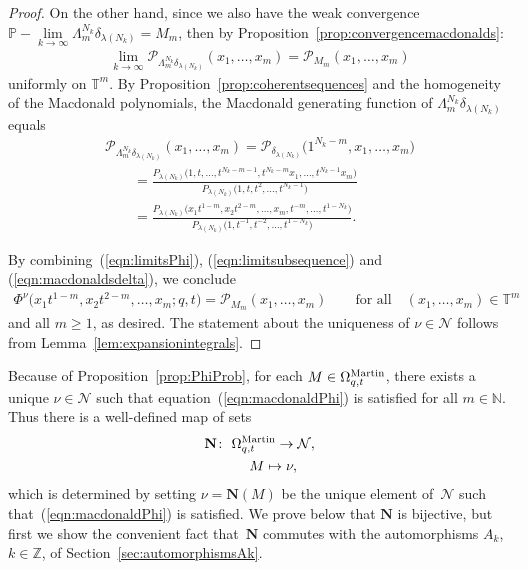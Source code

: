\documentclass[pdftex]{sigma}
\numberwithin{equation}{section}
\newcommand{\Z}{\mathbb{Z}}
\newcommand{\N}{\mathbb{N}}
\newcommand{\Nu}{\mathcal{N}}
\newcommand{\PPP}{\mathcal{P}}
\newcommand{\TT}{\mathbb{T}}
\newcommand{\Mart}{\Omega_{q, t}^{\rm Martin}}
\newcommand{\NN}{\mathbf{N}}
\begin{document}
\begin{proof}
On the other hand, since we also have the weak convergence $\mathbb{P}-\lim\limits_{k\rightarrow\infty}{\Lambda^{N_k}_m\delta_{\lambda(N_k)}} = M_m$, then by Proposition~\ref{prop:convergencemacdonalds}:
\begin{gather}\label{eqn:limitsubsequence}
\lim_{k \rightarrow \infty}{\PPP_{\Lambda^{N_k}_m\delta_{\lambda(N_k)}}(x_1, \dots, x_m)} = \PPP_{M_m}(x_1, \dots, x_m)
\end{gather}
uniformly on $\TT^m$. By Proposition~\ref{prop:coherentsequences} and the homogeneity of the Macdonald polynomials, the Macdonald generating function of $\Lambda^{N_k}_m\delta_{\lambda(N_k)}$ equals
\begin{gather}
\PPP_{\Lambda^{N_k}_m\delta_{\lambda(N_k)}}(x_1, \dots, x_m) = \PPP_{\delta_{\lambda(N_k)}}\big(1^{N_k - m}, x_1, \dots, x_m\big)\nonumber\\
\qquad{} = \frac{P_{\lambda(N_k)}\big(1, t, \dots, t^{N_k - m - 1}, t^{N_k - m}x_1, \dots, t^{N_k - 1}x_m\big)}{P_{\lambda(N_k)}\big(1, t, t^2, \dots, t^{N_k - 1}\big)}\nonumber\\
\qquad{} = \frac{P_{\lambda(N_k)}\big(x_1 t^{1-m}, x_2 t^{2-m}, \dots, x_m, t^{-m}, \dots, t^{1 - N_k}\big)}{P_{\lambda(N_k)}\big(1, t^{-1}, t^{-2}, \dots, t^{1 - N_k}\big)}.\label{eqn:macdonaldsdelta}
\end{gather}

By combining~(\ref{eqn:limitsPhi}), (\ref{eqn:limitsubsequence}) and (\ref{eqn:macdonaldsdelta}), we conclude
\begin{gather*} \Phi^{\nu}\big(x_1 t^{1-m}, x_2 t^{2-m}, \dots, x_m; q, t\big) = \mathcal{P}_{M_m}(x_1, \dots, x_m) \qquad\text{for all}\quad (x_1, \dots, x_m) \in \TT^m
 \end{gather*} and all $m\geq 1$, as desired.
The statement about the uniqueness of $\nu\in\Nu$ follows from Lemma~\ref{lem:expansionintegrals}.
\end{proof}

Because of Proposition~\ref{prop:PhiProb}, for each $M\in\Mart$, there exists a unique $\nu\in\Nu$ such that equation~(\ref{eqn:macdonaldPhi}) is satisf\/ied for all $m\in\N$. Thus there is a well-def\/ined map of sets
\begin{gather}
\NN\colon \ \Omega_{q, t}^{{\rm Martin}} \rightarrow \Nu,\nonumber\\
\hphantom{\NN\colon}{} \ M \mapsto \nu,\label{def:Nmap1}
\end{gather}
which is determined by setting $\nu = \NN(M)$ be the unique element of~$\Nu$ such that~(\ref{eqn:macdonaldPhi}) is satisf\/ied. We prove below that $\NN$ is bijective, but f\/irst we show the convenient fact that~$\NN$ commutes with the automorphisms $A_k$, $k\in\Z$, of Section~\ref{sec:automorphismsAk}.
\end{document}
